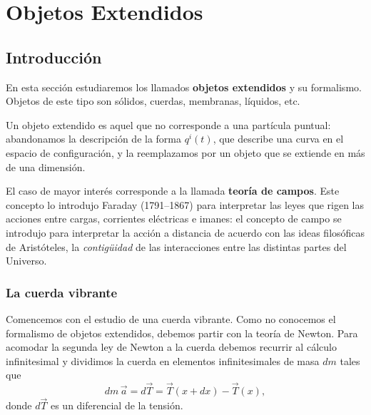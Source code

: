 \chapter{Objetos Extendidos}

\section{Introducción}

En esta sección estudiaremos los llamados \textbf{objetos extendidos} y
su formalismo. Objetos de este tipo son sólidos, cuerdas, membranas,
líquidos, etc.

Un objeto extendido es aquel que no corresponde a una partícula puntual:
abandonamos la descripción de la forma $q^i(t)$, que describe una curva
en el espacio de configuración, y la reemplazamos por un objeto que se
extiende en más de una dimensión.

El caso de mayor interés corresponde a la llamada \textbf{teoría de
campos}. Este concepto lo introdujo Faraday (1791--1867) para interpretar
las leyes que rigen las acciones entre cargas, corrientes eléctricas e
imanes: el concepto de campo se introdujo para interpretar la acción a
distancia de acuerdo con las ideas filosóficas de Aristóteles, la
\emph{contigüidad} de las interacciones entre las distintas partes del
Universo.

\subsection{La cuerda vibrante}

Comencemos con el estudio de una cuerda vibrante. Como no conocemos el
formalismo de objetos extendidos, debemos partir con la teoría de
Newton. Para acomodar la segunda ley de Newton a la cuerda debemos
recurrir al cálculo infinitesimal y dividimos la cuerda en elementos
infinitesimales de masa $dm$ tales que
\[
dm\,\vec a = d\vec T = \vec T(x+dx) - \vec T(x),
\]
donde $d\vec T$ es un diferencial de la tensión.

\begin{center}
\end{center}


